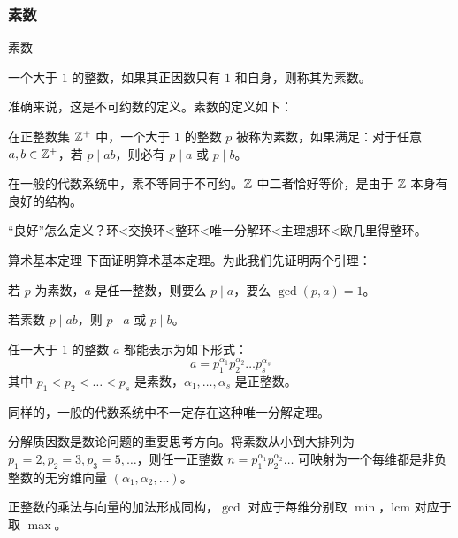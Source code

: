 \documentclass[../main.tex]{subfiles}
\begin{document}
\subsubsection{素数}

\begin{frame}{素数}

\begin{defi}
一个大于 $1$ 的整数，如果其正因数只有 $1$ 和自身，则称其为素数。
\end{defi}\pause

准确来说，这是不可约数的定义。素数的定义如下：

\begin{defi}
在正整数集 $\mathbb{Z}^{+}$ 中，一个大于 $1$ 的整数 $p$ 被称为素数，如果满足：对于任意 $a,b\in\mathbb{Z}^{+}$，若 $p\mid ab$，则必有 $p\mid a$ 或 $p\mid b$。
\end{defi}\pause

在一般的代数系统中，素不等同于不可约。$\mathbb{Z}$ 中二者恰好等价，是由于 $\mathbb{Z}$ 本身有良好的结构。 \pause

“良好”怎么定义？环<交换环<整环<唯一分解环<主理想环<欧几里得整环。
\end{frame}

\begin{frame}{算术基本定理}
下面证明算术基本定理。为此我们先证明两个引理：

\begin{theo}
若 $p$ 为素数，$a$ 是任一整数，则要么 $p\mid a$，要么 $\gcd(p,a)=1$。
\end{theo} \pause

\begin{theo}[欧几里得引理]
若素数 $p\mid ab$，则 $p\mid a$ 或 $p\mid b$。
\end{theo}
\end{frame}

\begin{frame}
\begin{theo}[算术基本定理]
任一大于 $1$ 的整数 $a$ 都能表示为如下形式：
$$
a=p_1^{\alpha_1}p_2^{\alpha_2}\dots p_s^{\alpha_s}
$$
其中 $p_1<p_2<\dots<p_s$ 是素数，$\alpha_1,\dots,\alpha_s$ 是正整数。
\end{theo} \pause

同样的，一般的代数系统中不一定存在这种唯一分解定理。 \pause

分解质因数是数论问题的重要思考方向。将素数从小到大排列为 $p_1=2,p_2=3,p_3=5,\dots$，则任一正整数 $n=p_1^{\alpha_1}p_2^{\alpha_2}\dots$ 可映射为一个每维都是非负整数的无穷维向量 $(\alpha_1,\alpha_2,\dots)$。

正整数的乘法与向量的加法形成同构，$\gcd$ 对应于每维分别取 $\min$，$\mathrm{lcm}$ 对应于取 $\max$。
\end{frame}
\end{document}
